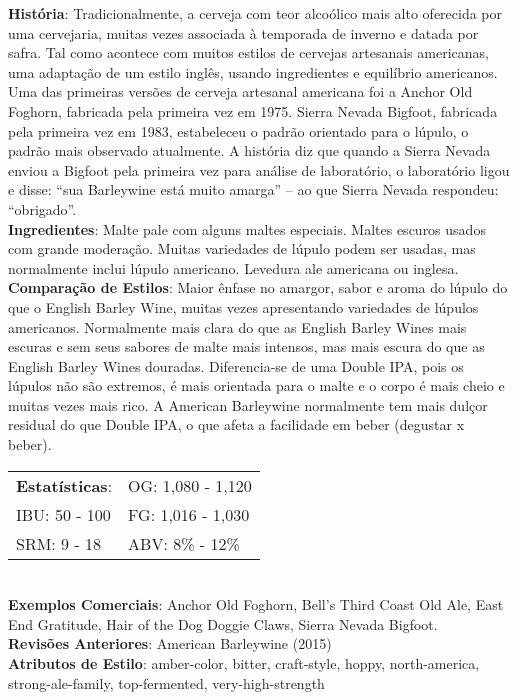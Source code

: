 \textbf{História}: Tradicionalmente, a cerveja com teor alcoólico mais alto oferecida por uma cervejaria, muitas vezes associada à temporada de inverno e datada por safra. Tal como acontece com muitos estilos de cervejas artesanais americanas, uma adaptação de um estilo inglês, usando ingredientes e equilíbrio americanos. Uma das primeiras versões de cerveja artesanal americana foi a Anchor Old Foghorn, fabricada pela primeira vez em 1975. Sierra Nevada Bigfoot, fabricada pela primeira vez em 1983, estabeleceu o padrão orientado para o lúpulo, o padrão mais observado atualmente. A história diz que quando a Sierra Nevada enviou a Bigfoot pela primeira vez para análise de laboratório, o laboratório ligou e disse: “sua Barleywine está muito amarga” – ao que Sierra Nevada respondeu: “obrigado”. \\
\textbf{Ingredientes}: Malte pale com alguns maltes especiais. Maltes escuros usados com grande moderação. Muitas variedades de lúpulo podem ser usadas, mas normalmente inclui lúpulo americano. Levedura ale americana ou inglesa. \\
\textbf{Comparação de Estilos}: Maior ênfase no amargor, sabor e aroma do lúpulo do que o English Barley Wine, muitas vezes apresentando variedades de lúpulos americanos. Normalmente mais clara do que as English Barley Wines mais escuras e sem seus sabores de malte mais intensos, mas mais escura do que as English Barley Wines douradas. Diferencia-se de uma Double IPA, pois os lúpulos não são extremos, é mais orientada para o malte e o corpo é mais cheio e muitas vezes mais rico. A American Barleywine normalmente tem mais dulçor residual do que Double IPA, o que afeta a facilidade em beber (degustar x beber). \\
\begin{tabular}{@{}p{35mm}p{35mm}@{}}
  \textbf{Estatísticas}: & OG: 1,080 - 1,120  \\
  IBU: 50 - 100  & FG: 1,016 - 1,030  \\
  SRM: 9 - 18 & ABV: 8\% - 12\%
\end{tabular}\\
\textbf{Exemplos Comerciais}: Anchor Old Foghorn, Bell's Third Coast Old Ale, East End Gratitude, Hair of the Dog Doggie Claws, Sierra Nevada Bigfoot. \\
\textbf{Revisões Anteriores}: American Barleywine (2015) \\
\textbf{Atributos de Estilo}: amber-color, bitter, craft-style, hoppy, north-america, strong-ale-family, top-fermented, very-high-strength
